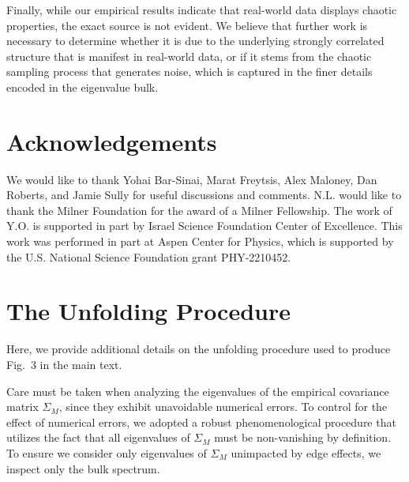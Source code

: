 \documentclass{article}
\begin{document}
Finally, while our empirical results indicate that real-world data displays chaotic properties, the exact source is not evident. We believe that further work is necessary to determine whether it is due to the underlying strongly correlated structure that is manifest in real-world data, or if it stems from the chaotic sampling process that generates noise, which is captured in the finer details encoded in the eigenvalue bulk.



\section{Acknowledgements}
\label{sec:Acknowledgements}

We would like to thank Yohai Bar-Sinai, Marat Freytsis, Alex Maloney, Dan Roberts, and Jamie Sully for useful discussions and comments. N.L. would
like to thank the Milner Foundation for the award of a Milner Fellowship.
The work of Y.O. is supported in part by Israel Science Foundation Center of Excellence.
This work was performed in part at Aspen Center for Physics, which is supported by the U.S. National Science Foundation grant PHY-2210452.














\newpage

\appendix


\section{The Unfolding Procedure}
\label{sec:unfolding}

Here, we provide additional details on the unfolding procedure used to produce Fig.~3 in the main text.


Care must be taken when analyzing the eigenvalues of the empirical covariance matrix $\Sigma_M$, since they exhibit unavoidable numerical errors. To control for the effect of numerical errors, we adopted a robust phenomenological procedure that utilizes the fact that all eigenvalues of $\Sigma_M$ must be non-vanishing by definition. To ensure we consider only eigenvalues of $\Sigma_M$ unimpacted by edge effects, we inspect only the bulk spectrum.
\end{document}
